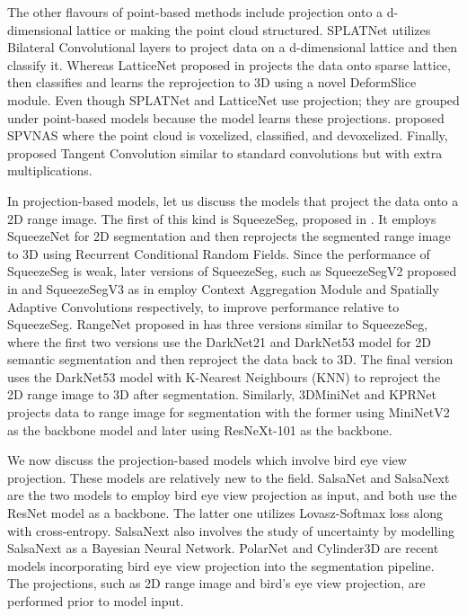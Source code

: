 The other flavours of point-based methods include projection onto a d-dimensional lattice or making the point cloud structured.
SPLATNet \cite{Su_2018_CVPR_splatnet} utilizes Bilateral Convolutional layers to project data on a d-dimensional lattice and then classify it.
Whereas LatticeNet proposed in \cite{rosu2019latticenet} projects the data onto sparse lattice, then classifies and learns the reprojection to 3D using a novel DeformSlice module.
Even though SPLATNet and LatticeNet use projection; they are grouped under point-based models because the model learns these projections.
\cite{spvnas} proposed SPVNAS where the point cloud is voxelized, classified, and devoxelized.
Finally, \cite{Tatarchenko_2018_CVPR_tangconv} proposed Tangent Convolution similar to standard convolutions but with extra multiplications.

In projection-based models, let us discuss the models that project the data onto a 2D range image.
The first of this kind is SqueezeSeg, proposed in \cite{Sequeseseg_2018}. It employs SqueezeNet for 2D segmentation and then reprojects the segmented range image to 3D using Recurrent Conditional Random Fields.
Since the performance of SqueezeSeg is weak, later versions of SqueezeSeg, such as SqueezeSegV2 proposed in \cite{SqueezeSegv2} and SqueezeSegV3 as in \cite{xu2020squeezesegv3} employ Context Aggregation Module and Spatially Adaptive Convolutions respectively, to improve performance relative to SqueezeSeg.
RangeNet proposed in \cite{Milioto2019} has three versions similar to SqueezeSeg, where the first two versions use the DarkNet21 and DarkNet53 model for 2D semantic segmentation and then reproject the data back to 3D.
The final version uses the DarkNet53 model with K-Nearest Neighbours (KNN) to reproject the 2D range image to 3D after segmentation.
Similarly, 3DMiniNet \cite{3Dmininet} and KPRNet \cite{kochanov2020kprnet} projects data to range image for segmentation with the  former using MiniNetV2 as the backbone model and later using ResNeXt-101 as the backbone.

We now discuss the projection-based models which involve bird eye view projection.
These models are relatively new to the field.
SalsaNet \cite{salsanet2020} and SalsaNext \cite{SalsaNext_2020} are the two models to employ bird eye view projection as input, and both use the ResNet
model as a backbone.
The latter one utilizes Lovasz-Softmax loss along with cross-entropy.
SalsaNext also involves the study of uncertainty by modelling SalsaNext as a Bayesian Neural Network.
PolarNet \cite{polarnet} and Cylinder3D \cite{zhu2020cylindrical} are recent models incorporating bird eye view projection into the segmentation pipeline.
The projections, such as 2D range image and bird's eye view projection, are performed prior to model input.

